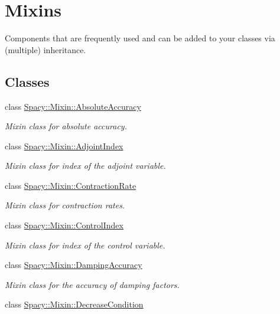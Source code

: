 \hypertarget{group__MixinGroup}{}\section{Mixins}
\label{group__MixinGroup}


Components that are frequently used and can be added to your classes via (multiple) inheritance.  


\subsection*{Classes}
\begin{DoxyCompactItemize}
\item 
class \hyperlink{classSpacy_1_1Mixin_1_1AbsoluteAccuracy}{Spacy\+::\+Mixin\+::\+Absolute\+Accuracy}
\begin{DoxyCompactList}\small\item\em Mixin class for absolute accuracy. \end{DoxyCompactList}\item 
class \hyperlink{classSpacy_1_1Mixin_1_1AdjointIndex}{Spacy\+::\+Mixin\+::\+Adjoint\+Index}
\begin{DoxyCompactList}\small\item\em Mixin class for index of the adjoint variable. \end{DoxyCompactList}\item 
class \hyperlink{classSpacy_1_1Mixin_1_1ContractionRate}{Spacy\+::\+Mixin\+::\+Contraction\+Rate}
\begin{DoxyCompactList}\small\item\em Mixin class for contraction rates. \end{DoxyCompactList}\item 
class \hyperlink{classSpacy_1_1Mixin_1_1ControlIndex}{Spacy\+::\+Mixin\+::\+Control\+Index}
\begin{DoxyCompactList}\small\item\em Mixin class for index of the control variable. \end{DoxyCompactList}\item 
class \hyperlink{classSpacy_1_1Mixin_1_1DampingAccuracy}{Spacy\+::\+Mixin\+::\+Damping\+Accuracy}
\begin{DoxyCompactList}\small\item\em Mixin class for the accuracy of damping factors. \end{DoxyCompactList}\item 
class \hyperlink{classSpacy_1_1Mixin_1_1DecreaseCondition}{Spacy\+::\+Mixin\+::\+Decrease\+Condition}

\end{DoxyCompactItemize}
